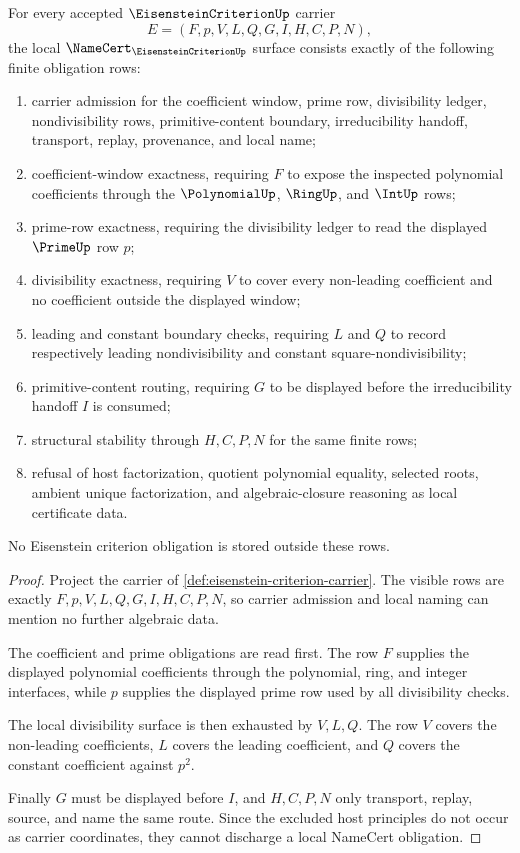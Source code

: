 \begin{theorem}
\label{thm:eisenstein-criterion-namecert-obligations}
For every accepted $\EisensteinCriterionUp$ carrier
$$
E=(F,p,V,L,Q,G,I,H,C,P,N),
$$
the local $\NameCert_{\EisensteinCriterionUp}$ surface consists exactly of the following finite obligation rows:
\begin{enumerate}
\item carrier admission for the coefficient window, prime row, divisibility ledger, nondivisibility rows, primitive-content boundary, irreducibility handoff, transport, replay, provenance, and local name;
\item coefficient-window exactness, requiring $F$ to expose the inspected polynomial coefficients through the $\PolynomialUp$, $\RingUp$, and $\IntUp$ rows;
\item prime-row exactness, requiring the divisibility ledger to read the displayed $\PrimeUp$ row $p$;
\item divisibility exactness, requiring $V$ to cover every non-leading coefficient and no coefficient outside the displayed window;
\item leading and constant boundary checks, requiring $L$ and $Q$ to record respectively leading nondivisibility and constant square-nondivisibility;
\item primitive-content routing, requiring $G$ to be displayed before the irreducibility handoff $I$ is consumed;
\item structural stability through $H,C,P,N$ for the same finite rows;
\item refusal of host factorization, quotient polynomial equality, selected roots, ambient unique factorization, and algebraic-closure reasoning as local certificate data.
\end{enumerate}
No Eisenstein criterion obligation is stored outside these rows.
\end{theorem}
\begin{proof}
Project the carrier of \autoref{def:eisenstein-criterion-carrier}. The visible rows are exactly $F,p,V,L,Q,G,I,H,C,P,N$, so carrier admission and local naming can mention no further algebraic data.

The coefficient and prime obligations are read first. The row $F$ supplies the displayed polynomial coefficients through the polynomial, ring, and integer interfaces, while $p$ supplies the displayed prime row used by all divisibility checks.

The local divisibility surface is then exhausted by $V,L,Q$. The row $V$ covers the non-leading coefficients, $L$ covers the leading coefficient, and $Q$ covers the constant coefficient against $p^2$.

Finally $G$ must be displayed before $I$, and $H,C,P,N$ only transport, replay, source, and name the same route. Since the excluded host principles do not occur as carrier coordinates, they cannot discharge a local NameCert obligation.
\end{proof}

